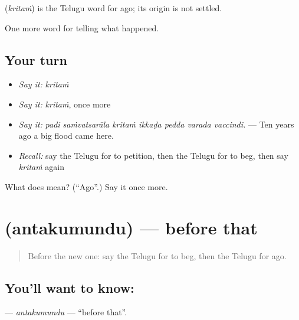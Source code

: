 \begin{cousinweb}
\textbf{} (\emph{kritaṁ}) is the Telugu word for ago; its origin is not settled.
\end{cousinweb}

\begin{grammarlens}[title={What you've built}]
One more word for telling what happened.
\end{grammarlens}

\subsection*{Your turn}
\begin{itemize}
\raggedright
  \item \emph{Say it:} \emph{kritaṁ}
  \item \emph{Say it:} \emph{kritaṁ}, once more
  \item \emph{Say it:} \emph{padi saṁvatsarāla kritaṁ ikkaḍa pedda varada vaccindi.} — Ten years ago a big flood came here.
  \item \emph{Recall:} say the Telugu for to petition, then the Telugu for to beg, then say \emph{kritaṁ} again
\end{itemize}

\begin{tcolorbox}[breakable,colback=teal!4,colframe=teal!35!black,title={Before you move on}]
What does  mean? (\textquotedblleft{}Ago\textquotedblright{}.) Say it once more.
\end{tcolorbox}
\section[\texorpdfstring{\te{అంతకుముందు} (antakumundu)}{అంతకుముందు (antakumundu)}]{ (antakumundu) — before that}

\label{lesson:TE-C380-antakumundu}



\begin{quote}
Before the new one: say the Telugu for to beg, then the Telugu for ago.
\end{quote}

\subsection*{You'll want to know: }
\textbf{} — \emph{antakumundu} — \textquotedblleft{}before that\textquotedblright{}.

